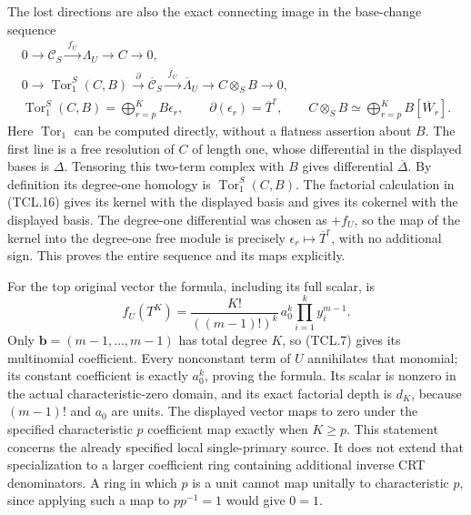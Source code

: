 The lost directions are also the exact connecting image in the
base-change sequence
\[
 \begin{gathered}
 0\longrightarrow\mathcal C_S\xrightarrow{\ f_U\ }
             \Lambda_U\longrightarrow C\longrightarrow0,\\
 0\longrightarrow\operatorname{Tor}_1^S(C,B)
    \xrightarrow{\ \partial\ }\overline{\mathcal C}_S
    \xrightarrow{\ \overline f_U\ }\overline\Lambda_U
    \longrightarrow C\otimes_S B\longrightarrow0,\\
 \operatorname{Tor}_1^S(C,B)=\bigoplus_{r=p}^K B\epsilon_r,
       \qquad \partial(\epsilon_r)=\overline T^r,
       \qquad C\otimes_S B\simeq
                    \bigoplus_{r=p}^K B[\overline W_r].
 \end{gathered}
 \tag{TCL.19}\label{CFStage:eq:tcl-tor}
\]
Here \(\operatorname{Tor}_1\) can be computed directly, without
a flatness assertion about \(B\). The first line is a free
resolution of \(C\) of length one, whose differential in the
displayed bases is \(\Delta\). Tensoring this two-term complex
with \(B\) gives differential \(\overline\Delta\).
By definition its degree-one homology is
\(\operatorname{Tor}_1^S(C,B)\). The factorial calculation in
(TCL.16) gives its kernel with the displayed basis and gives its
cokernel with the displayed basis. The degree-one differential
was chosen as \(+f_U\), so the map of the kernel into the
degree-one free module is precisely
\(\epsilon_r\mapsto\overline T^r\), with no additional sign.
This proves the entire sequence and its maps explicitly.

For the top original vector the formula, including its full scalar, is
\[
 f_U(T^K)=\frac{K!}{((m-1)!)^k}\,a_0^k
                    \prod_{i=1}^k y_i^{m-1}.
 \tag{TCL.20}\label{CFStage:eq:tcl-terminal}
\]
Only \(\mathbf b=(m-1,\ldots,m-1)\) has total degree \(K\),
so (TCL.7) gives its multinomial coefficient. Every nonconstant
term of \(U\) annihilates that monomial; its constant coefficient
is exactly \(a_0^k\), proving the formula. Its scalar is nonzero
in the actual characteristic-zero domain, and its exact factorial
depth is \(d_K\), because \((m-1)!\) and \(a_0\) are units.
The displayed vector maps to zero under the specified characteristic
\(p\) coefficient map exactly when \(K\geq p\). This statement
concerns the already specified local single-primary source. It does
not extend that specialization to a larger coefficient ring containing
additional inverse CRT denominators. A ring in which \(p\) is a
unit cannot map unitally to characteristic \(p\), since applying
such a map to \(p p^{-1}=1\) would give \(0=1\).

